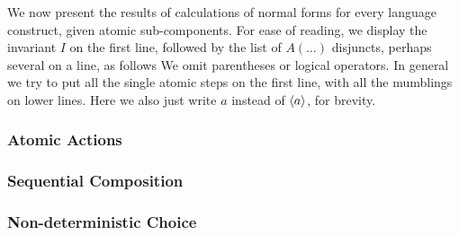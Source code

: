 We now present the results of calculations of normal forms for every language
construct, given atomic sub-components.
For ease of reading,
we display the invariant $I$ on the first line,
followed by the list of $A(\dots)$ disjuncts, perhaps several on a line,
as follows
We omit parentheses or logical operators.
In general we try to put all the single atomic steps on the first line,
with all the mumblings on lower lines.
Here we also just write $a$ instead of $\langle a\rangle$,
for brevity.

\subsubsection{Atomic Actions}

\subsubsection{Sequential Composition}

\subsubsection{Non-deterministic Choice}

